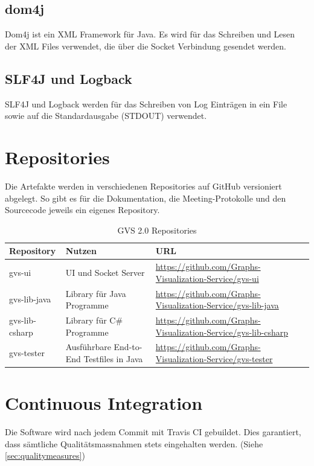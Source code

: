 \documentclass[11pt,a4paper,english,oneside]{book}
\numberwithin{equation}{chapter}
\begin{document}
	\subsection{dom4j}
	Dom4j \cite{dom4j} ist ein XML Framework für Java. Es wird für das Schreiben und Lesen der XML Files verwendet, die über die Socket Verbindung gesendet werden.
	
	\subsection{SLF4J und Logback}
	SLF4J \cite{slf4j} und Logback \cite{logback} werden für das Schreiben von Log Einträgen in ein File sowie auf die Standardausgabe (STDOUT) verwendet.
	
		
		
	\section{Repositories}
	Die Artefakte werden in verschiedenen Repositories auf GitHub versioniert abgelegt. So gibt es für die Dokumentation, die Meeting-Protokolle und den Sourcecode jeweils ein eigenes Repository.
	
	\begin{table}[h!]
		\centering
		\begin{tabularx}{\linewidth}{l l X}
			\toprule 
			Repository & Nutzen & URL \\
			\midrule
			gvs-ui & UI und Socket Server & \url{https://github.com/Graphs-Visualization-Service/gvs-ui}  \\
			gvs-lib-java & Library für Java Programme & \url{https://github.com/Graphs-Visualization-Service/gvs-lib-java} \\
			gvs-lib-csharp & Library für C\# Programme & \url{https://github.com/Graphs-Visualization-Service/gvs-lib-csharp} \\
			gvs-tester & Ausführbare End-to-End Testfiles in Java & \url{https://github.com/Graphs-Visualization-Service/gvs-tester} \\
			\bottomrule 
		\end{tabularx} 
		\caption{GVS 2.0 Repositories} 
		\label{tbl:repos}
	\end{table}
	
	\section{Continuous Integration}
	Die Software wird nach jedem Commit mit Travis CI \cite{travisci} gebuildet. Dies garantiert, dass sämtliche Qualitätsmassnahmen stets eingehalten werden. (Siehe \ref{sec:qualitymeasures})
	
\end{document}
